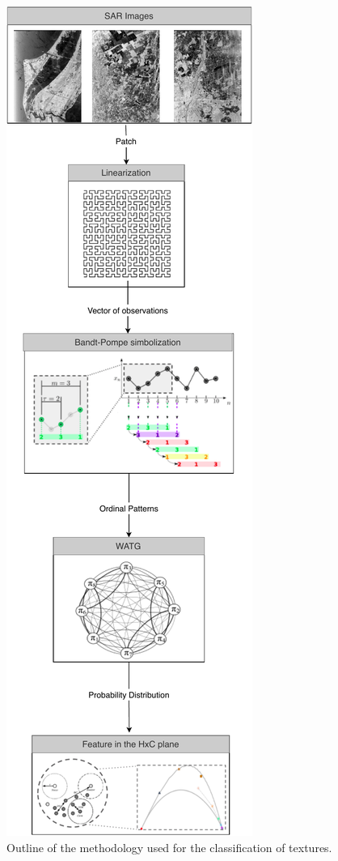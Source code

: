 \documentclass[journal]{IEEEtran}
\begin{document}
	\begin{figure}
		\centering
		\includegraphics[width=.7\columnwidth]{Figures/methodology.pdf}
		\caption{Outline of the methodology used for the classification of textures.}
		\label{fig:WATG}
	\end{figure}
	
\end{document}
